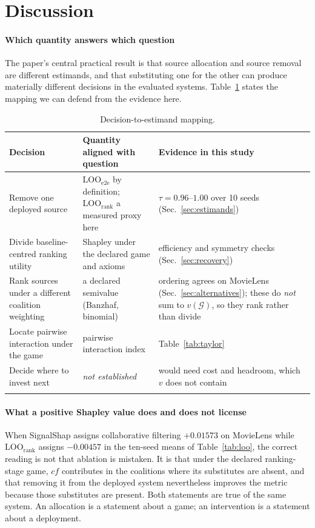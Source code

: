 \documentclass[pdflatex,sn-basic,Numbered]{sn-jnl}
\theoremstyle{plain}
\theoremstyle{definition}
\newcommand{\G}{\mathcal{G}}
\newcommand{\LOOr}{\mathrm{LOO}_{\mathrm{rank}}}
\newcommand{\LOOe}{\mathrm{LOO}_{\mathrm{e2e}}}
\begin{document}
\section{Discussion}\label{sec:discussion}

\paragraph{Which quantity answers which question}
The paper's central practical result is that source allocation and source
removal are different estimands, and that substituting one for the other can
produce materially different decisions in the evaluated systems.
Table~\ref{tab:decisions} states the mapping we can
defend from the evidence here.

\begin{table}[tbp]
\caption{Decision-to-estimand mapping.}
\label{tab:decisions}
\begin{tabular}{@{}p{}p{}p{}@{}}
\toprule
Decision & Quantity aligned with question & Evidence in this study \\
\midrule
Remove one deployed source
  & $\LOOe$ by definition; $\LOOr$ a measured proxy here
  & $\tau = 0.96$--$1.00$ over 10 seeds (Sec.~\ref{sec:estimands}) \\[2pt]
Divide baseline-centred ranking utility
  & Shapley under the declared game and axioms
  & efficiency and symmetry checks (Sec.~\ref{sec:recovery}) \\[2pt]
Rank sources under a different
coalition weighting
  & a declared semivalue (Banzhaf, binomial)
  & ordering agrees on MovieLens (Sec.~\ref{sec:alternatives}); these do
    \emph{not} sum to $v(\G)$, so they rank rather than divide \\[2pt]
Locate pairwise interaction under the game
  & pairwise interaction index
  & Table~\ref{tab:taylor} \\[2pt]
Decide where to invest next
  & \emph{not established}
  & would need cost and headroom, which $v$ does not contain \\
\botrule
\end{tabular}
\end{table}

\paragraph{What a positive Shapley value does and does not license}
When SignalShap assigns collaborative filtering $+0.01573$ on MovieLens while
$\LOOr$ assigns $-0.00457$ in the ten-seed means of Table~\ref{tab:loo}, the correct reading is not that ablation is
mistaken. It is that under the declared ranking-stage game, $cf$ contributes in
the coalitions where its substitutes are absent, and that removing it from the
deployed system nevertheless improves the metric because those substitutes are
present. Both statements are true of the same system. An allocation is a
statement about a game; an intervention is a statement about a deployment.
\end{document}
